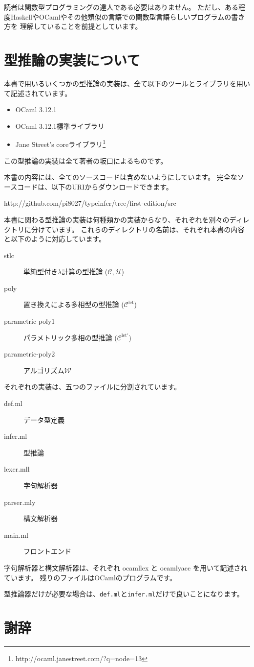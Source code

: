 読者は関数型プログラミングの達人である必要はありません。
ただし、ある程度HaskellやOCamlやその他類似の言語での関数型言語らしいプログラムの書き方を
理解していることを前提としています。

\section*{型推論の実装について}

本書で用いるいくつかの型推論の実装は、全て以下のツールとライブラリを用いて記述されています。

\begin{itemize}
 \item OCaml 3.12.1
 \item OCaml 3.12.1標準ライブラリ
 \item Jane Street's coreライブラリ\footnote{http://ocaml.janestreet.com/?q=node=13}
\end{itemize}

この型推論の実装は全て著者の坂口によるものです。

本書の内容には、全てのソースコードは含めないようにしています。
完全なソースコードは、以下のURIからダウンロードできます。

http://github.com/pi8027/typeinfer/tree/first-edition/src

本書に関わる型推論の実装は何種類かの実装からなり、それぞれを別々のディレクトリに分けています。
これらのディレクトリの名前は、それぞれ本書の内容と以下のように対応しています。

\begin{description}
  \item[stlc] 単純型付き$\lambda$計算の型推論 ($\mathcal C$, $\mathcal U$)
  \item[poly] 置き換えによる多相型の型推論 ($\mathcal C^\mathrm{let}$)
  \item[parametric-poly1] パラメトリック多相の型推論 ($\mathcal C^\mathrm{let'}$)
  \item[parametric-poly2] アルゴリズム$\mathcal W$
\end{description}

それぞれの実装は、五つのファイルに分割されています。

\begin{description}
  \item[def.ml] データ型定義
  \item[infer.ml] 型推論
  \item[lexer.mll] 字句解析器
  \item[parser.mly] 構文解析器
  \item[main.ml] フロントエンド
\end{description}

字句解析器と構文解析器は、それぞれ ocamllex と ocamlyacc を用いて記述されています。
残りのファイルはOCamlのプログラムです。

型推論器だけが必要な場合は、\texttt{def.ml}と\texttt{infer.ml}だけで良いことになります。

\section*{謝辞}



